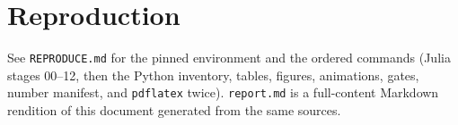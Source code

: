 \documentclass[10pt]{article}
\begin{document}
\section*{Reproduction}
See \texttt{REPRODUCE.md} for the pinned environment and the ordered commands (Julia stages 00--12, then the Python inventory, tables, figures, animations, gates, number manifest, and \texttt{pdflatex} twice). \texttt{report.md} is a full-content Markdown rendition of this document generated from the same sources.
\end{document}
